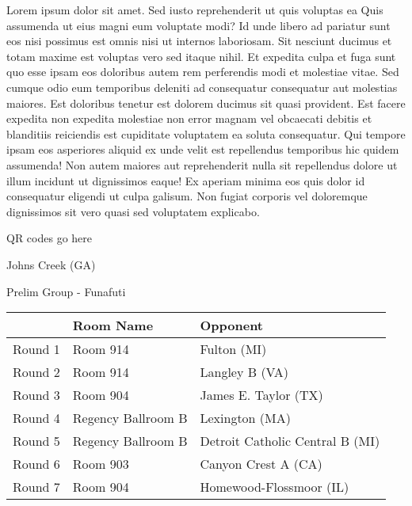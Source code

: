 \documentclass{article}%
\begin{document}
\vspace*{8pt}%
\linebreak%
\newline%
\newline%
Lorem ipsum dolor sit amet. Sed iusto reprehenderit ut quis voluptas ea Quis assumenda ut eius magni eum voluptate modi? Id unde libero ad pariatur sunt eos nisi possimus est omnis nisi ut internos laboriosam. Sit nesciunt ducimus et totam maxime est voluptas vero sed itaque nihil. Et expedita culpa et fuga sunt quo esse ipsam eos doloribus autem rem perferendis modi et molestiae vitae.\newline%
\newline%
Sed cumque odio eum temporibus deleniti ad consequatur consequatur aut molestias maiores. Est doloribus tenetur est dolorem ducimus sit quasi provident. Est facere expedita non expedita molestiae non error magnam vel obcaecati debitis et blanditiis reiciendis est cupiditate voluptatem ea soluta consequatur. Qui tempore ipsam eos asperiores aliquid ex unde velit est repellendus temporibus hic quidem assumenda!\newline%
\newline%
Non autem maiores aut reprehenderit nulla sit repellendus dolore ut illum incidunt ut dignissimos eaque! Ex aperiam minima eos quis dolor id consequatur eligendi ut culpa galisum. Non fugiat corporis vel doloremque dignissimos sit vero quasi sed voluptatem explicabo.\newline%
\newline%
%
\vspace*{30pt}%
\begin{center}%
\begin{Huge}%
QR codes go here%
\end{Huge}%
\end{center}%
\newpage%
%
\begin{center}%
\begin{Huge}%
Johns Creek (GA)%
\end{Huge}%
\vspace*{8pt}%
\linebreak%
\begin{Large}%
Prelim Group {-} Funafuti%
\end{Large}%
\end{center}%
\begin{tabularx}{\textwidth}{|c|Y|Y|}%
\hline%
&Room Name&Opponent\\%
\hline%
Round 1&Room 914&Fulton (MI)\\%
Round 2&Room 914&Langley B (VA)\\%
Round 3&Room 904&James E. Taylor (TX)\\%
Round 4&Regency Ballroom B&Lexington (MA)\\%
Round 5&Regency Ballroom B&Detroit Catholic Central B (MI)\\%
Round 6&Room 903&Canyon Crest A (CA)\\%
Round 7&Room 904&Homewood{-}Flossmoor (IL)\\%
\hline%
\end{tabularx}%
\end{document}
